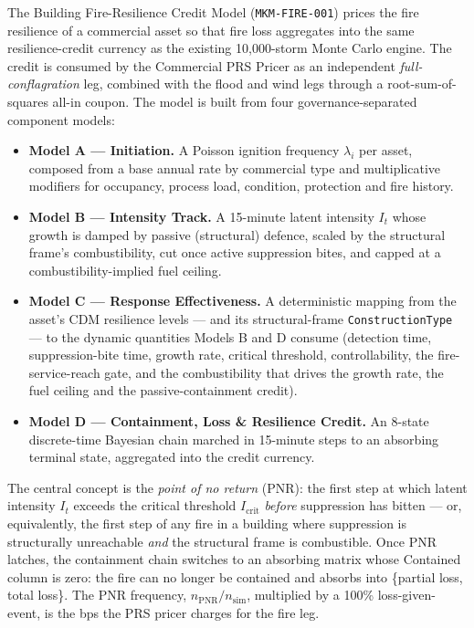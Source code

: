 \documentclass[11pt,a4paper]{article}
\begin{document}
\mkmtitlepage
\mkmlegalpage
\tableofcontents
\clearpage

\mkmexecsummary

The Building Fire-Resilience Credit Model (\texttt{MKM-FIRE-001}) prices the
fire resilience of a commercial asset so that fire loss aggregates into the same
resilience-credit currency as the existing 10{,}000-storm Monte Carlo engine.
The credit is consumed by the Commercial PRS Pricer as an independent
\emph{full-conflagration} leg, combined with the flood and wind legs through a
root-sum-of-squares all-in coupon. The model is built from four
governance-separated component models:

\begin{itemize}
  \item \textbf{Model A --- Initiation.} A Poisson ignition frequency
        $\lambda_i$ per asset, composed from a base annual rate by commercial
        type and multiplicative modifiers for occupancy, process load,
        condition, protection and fire history.
  \item \textbf{Model B --- Intensity Track.} A 15-minute latent intensity
        $I_t$ whose growth is damped by passive (structural) defence, scaled by
        the structural frame's combustibility, cut once active suppression bites,
        and capped at a combustibility-implied fuel ceiling.
  \item \textbf{Model C --- Response Effectiveness.} A deterministic mapping
        from the asset's CDM resilience levels --- and its structural-frame
        \texttt{ConstructionType} --- to the dynamic quantities Models B and D
        consume (detection time, suppression-bite time, growth rate, critical
        threshold, controllability, the fire-service-reach gate, and the
        combustibility that drives the growth rate, the fuel ceiling and the
        passive-containment credit).
  \item \textbf{Model D --- Containment, Loss \& Resilience Credit.} An 8-state
        discrete-time Bayesian chain marched in 15-minute steps to an absorbing
        terminal state, aggregated into the credit currency.
\end{itemize}

The central concept is the \emph{point of no return} (PNR): the first step at
which latent intensity $I_t$ exceeds the critical threshold $I_{\text{crit}}$
\emph{before} suppression has bitten --- or, equivalently, the first step of any
fire in a building where suppression is structurally unreachable \emph{and} the
structural frame is combustible. Once PNR latches, the containment chain switches
to an absorbing matrix whose Contained column is zero: the fire can no longer be
contained and absorbs into \{partial loss, total loss\}. The PNR frequency,
$n_{\text{PNR}}/n_{\text{sim}}$, multiplied by a 100\% loss-given-event, is the
bps the PRS pricer charges for the fire leg.
\end{document}
